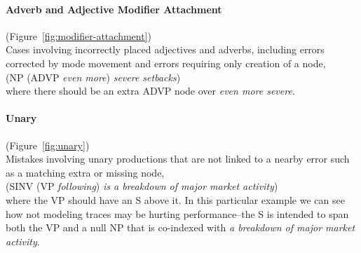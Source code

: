 \paragraph{Adverb and Adjective Modifier Attachment} (Figure~\ref{fig:modifier-attachment}) \\
Cases involving incorrectly placed adjectives and adverbs, including errors corrected by mode movement and errors requiring only creation of a node, \myeg \\
(NP (ADVP \emph{even more}) \emph{severe setbacks}) \\
where there should be an extra ADVP node over \emph{even more severe}.

\paragraph{Unary} (Figure~\ref{fig:unary}) \\
Mistakes involving unary productions that are not linked to a nearby error such as a matching extra or missing node, \myeg \\
(SINV (VP \emph{following}) \emph{is a breakdown of major market activity}) \\
where the VP should have an S above it.
In this particular example we can see how not modeling traces may be hurting performance--the S is intended to span both the VP and a null NP that is co-indexed with \emph{a breakdown of major market activity}.

\begin{landscape}
\begin{figure}
\begin{minipage}[b]{3in}
\centering

\end{minipage}\hfill
\begin{minipage}[b]{5in}
\centering

\end{minipage}
\end{figure}
\end{landscape}

\begin{figure}
\hfill
\begin{minipage}[b]{2.5in}
\centering

\end{minipage}\hfill
\begin{minipage}[b]{3.5in}
\centering

\end{minipage}\hfill
\end{figure}

